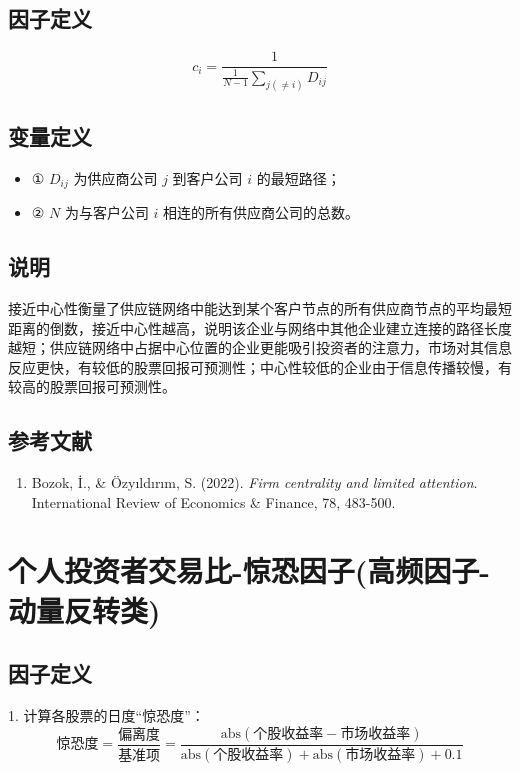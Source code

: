 \documentclass{article}
\begin{document}
\subsection{因子定义}
\begin{equation}
    c_i = \frac{1}{\frac{1}{N-1} \sum_{j(\neq i)} D_{ij}}
\end{equation}

\subsection{变量定义}
\begin{itemize}
    \item ① \( D_{ij} \) 为供应商公司 \( j \) 到客户公司 \( i \) 的最短路径；
    \item ② \( N \) 为与客户公司 \( i \) 相连的所有供应商公司的总数。
\end{itemize}

\subsection{说明}
接近中心性衡量了供应链网络中能达到某个客户节点的所有供应商节点的平均最短距离的倒数，接近中心性越高，说明该企业与网络中其他企业建立连接的路径长度越短；供应链网络中占据中心位置的企业更能吸引投资者的注意力，市场对其信息反应更快，有较低的股票回报可预测性；中心性较低的企业由于信息传播较慢，有较高的股票回报可预测性。

\subsection{参考文献}
\begin{enumerate}
    \item Bozok, İ., \& Özyıldırım, S. (2022). \textit{Firm centrality and limited attention}. International Review of Economics \& Finance, 78, 483-500.
\end{enumerate}

\section{个人投资者交易比-惊恐因子(高频因子-动量反转类)}

\subsection{因子定义}

1. 计算各股票的日度“惊恐度”：
\begin{equation}
    \text{惊恐度} = \frac{\text{偏离度}}{\text{基准项}} = \frac{\mathrm{abs}(\text{个股收益率} - \text{市场收益率})}{\mathrm{abs}(\text{个股收益率}) + \mathrm{abs}(\text{市场收益率}) + 0.1}
\end{equation}
\end{document}
